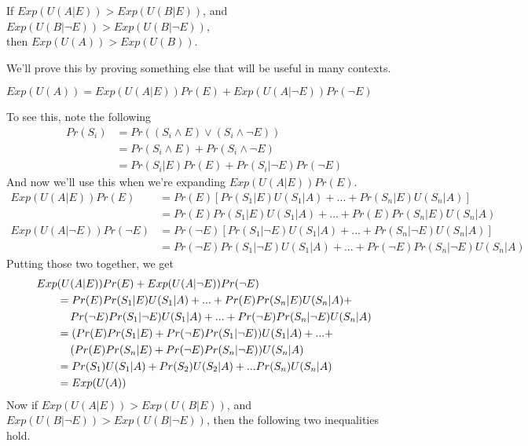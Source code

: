 \begin{itemize*}
\item If $Exp(U(A | E)) > Exp(U(B | E))$, and $Exp(U(B | \neg E)) > Exp(U(B | \neg E))$, \\ then $Exp(U(A)) > Exp(U(B))$.
\end{itemize*}
We'll prove this by proving something else that will be useful in many contexts.

\begin{itemize*}
\item $Exp(U(A)) = Exp(U(A|E))Pr(E) + Exp(U(A|\neg E))Pr(\neg E)$
\end{itemize*}
To see this, note the following
\begin{align*}
Pr(S_i) &= Pr((S_i \wedge E) \vee (S_i \wedge \neg E)) \\
 &= Pr(S_i \wedge E)  + Pr(S_i \wedge \neg E) \\
 &= Pr(S_i | E) Pr(E) + Pr(S_i | \neg E)Pr(\neg E)
\end{align*}
And now we'll use this when we're expanding $Exp(U(A|E))Pr(E)$.
\begin{align*}
Exp(U(A|E))Pr(E) &= Pr(E) [Pr(S_1|E) U(S_1|A) +  ... + Pr(S_n|E) U(S_n|A)] \\
 &= Pr(E)Pr(S_1|E) U(S_1|A)  + ... + Pr(E) Pr(S_n|E) U(S_n|A) \\
Exp(U(A|\neg E))Pr(\neg E) &= Pr(\neg E) [Pr(S_1|\neg E) U(S_1|A)  + ... + Pr(S_n|\neg E) U(S_n|A)] \\
 &= Pr(\neg E)Pr(S_1|\neg E) U(S_1|A)  + ... + Pr(\neg E) Pr(S_n|\neg E) U(S_n|A)
\end{align*}
Putting those two together, we get
\begin{align*}
Exp&(U(A|E))Pr(E) + Exp(U(A|\neg E))Pr(\neg E) \\
 &= Pr(E)Pr(S_1|E) U(S_1|A) + ... + Pr(E) Pr(S_n|E) U(S_n|A) + \\
 &\hspace{1.2em} Pr(\neg E)Pr(S_1|\neg E) U(S_1|A) +  ... + Pr(\neg E) Pr(S_n|\neg E) U(S_n|A) \\
 &= (Pr(E)Pr(S_1|E) + Pr(\neg E)Pr(S_1|\neg E)) U(S_1|A) + ... + \\
 &\hspace{1.2em} (Pr(E)Pr(S_n|E) + Pr(\neg E)Pr(S_n|\neg E)) U(S_n|A) \\
 &= Pr(S_1)U(S_1 | A) + Pr(S_2)U(S_2 | A) + ... Pr(S_n)U(S_n | A) \\
 &= Exp(U(A))
\end{align*}
Now if $Exp(U(A | E)) > Exp(U(B | E))$, and $Exp(U(B | \neg E)) > Exp(U(B | \neg E))$, then the following two inequalities hold.
